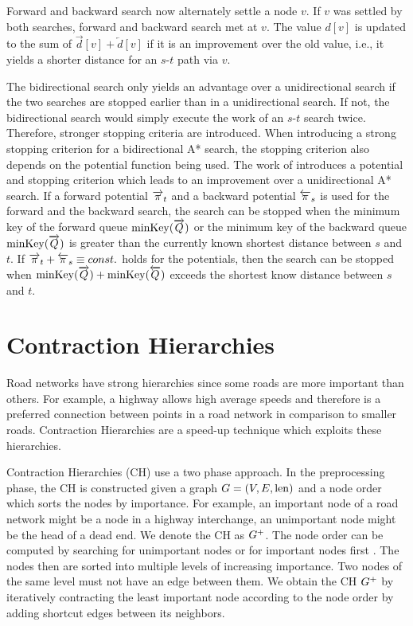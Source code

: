 Forward and backward search now alternately settle a node $v$. If $v$ was settled by both searches, forward and backward search met at $v$. The value $d[v]$ is updated to the sum of $\overrightarrow{d}[v] + \overleftarrow{d}[v]$ if it is an improvement over the old value, i.e., it yields a shorter distance for an $s$-$t$ path via $v$.

The bidirectional search only yields an advantage over a unidirectional search if the two searches are stopped earlier than in a unidirectional search. If not, the bidirectional search would simply execute the work of an $s$-$t$ search twice. Therefore, stronger stopping criteria are introduced. When introducing a strong stopping criterion for a bidirectional A* search, the stopping criterion also depends on the potential function being used. The work of \cite{goldberg:2005} introduces a potential and stopping criterion which leads to an improvement over a unidirectional A* search. If a forward potential $\overrightarrow{\pi}_t$ and a backward potential $\overleftarrow{\pi}_s$ is used for the forward and the backward search, the search can be stopped when the minimum key of the forward queue $\operatorname{minKey}(\overrightarrow{Q})$ or the minimum key of the backward queue $\operatorname{minKey}(\overrightarrow{Q})$ is greater than the currently known shortest distance between $s$ and $t$. If $\overrightarrow{\pi}_t + \overleftarrow{\pi}_s \equiv const.$ holds for the potentials, then the search can be stopped when $\operatorname{minKey}(\overrightarrow{Q}) + \operatorname{minKey}(\overleftarrow{Q})$ exceeds the shortest know distance between $s$ and $t$.

\section{Contraction Hierarchies\label{sec:ch}}
Road networks have strong hierarchies since some roads are more important than others. For example, a highway allows high average speeds and therefore is a preferred connection between points in a road network in comparison to smaller roads. Contraction Hierarchies \cite{geisberger:2012} are a speed-up technique which exploits these hierarchies.

Contraction Hierarchies (CH) use a two phase approach. In the preprocessing phase, the CH is constructed given a graph $G=(V,E,\operatorname{len})$ and a node order which sorts the nodes by importance. For example, an important node of a road network might be a node in a highway interchange, an unimportant node might be the head of a dead end. We denote the CH as $G^+$. The node order can be computed by searching for unimportant nodes \cite{geisberger:2012} or for important nodes first \cite{abraham:2012,delling:2014}. The nodes then are sorted into multiple levels of increasing importance. Two nodes of the same level must not have an edge between them. We obtain the CH $G^+$ by iteratively contracting the least important node according to the node order by adding shortcut edges between its neighbors.

